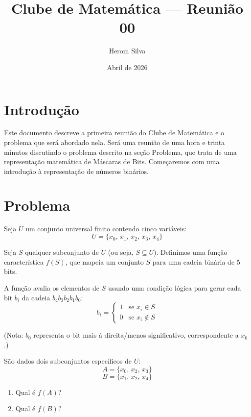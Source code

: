 \documentclass{article}
\title{Clube de Matemática — Reunião 00}
\author{Herom Silva}
\date{Abril de 2026}
\begin{document}
\maketitle

\section{Introdução}
Este documento descreve a primeira reunião do Clube de Matemática e o problema que será abordado nela. Será uma reunião de uma hora e trinta minutos discutindo o problema descrito na seção Problema, que trata de uma representação matemática de Máscaras de Bits. Começaremos com uma introdução à representação de números binários.

\section{Problema}

Seja $U$ um conjunto universal finito contendo cinco variáveis:
$$U = \{x_0,\, x_1,\, x_2,\, x_3,\, x_4\}$$

Seja $S$ qualquer subconjunto de $U$ (ou seja, $S \subseteq U$). Definimos uma função característica $f(S)$, que mapeia um conjunto $S$ para uma cadeia binária de 5 bits.

A função avalia os elementos de $S$ usando uma condição lógica para gerar cada bit $b_i$ da cadeia $b_4b_3b_2b_1b_0$:
$$
b_i =
\begin{cases}
    1 & \text{se } x_i \in S \\
    0 & \text{se } x_i \notin S
\end{cases}
$$

(Nota: $b_0$ representa o bit mais à direita/menos significativo, correspondente a $x_0$.)

São dados dois subconjuntos específicos de $U$:
$$A = \{x_0,\, x_2,\, x_3\}$$
$$B = \{x_1,\, x_2,\, x_4\}$$

\begin{enumerate}
    \item Qual é $f(A)$?
    \item Qual é $f(B)$?
\end{enumerate}
\end{document}
